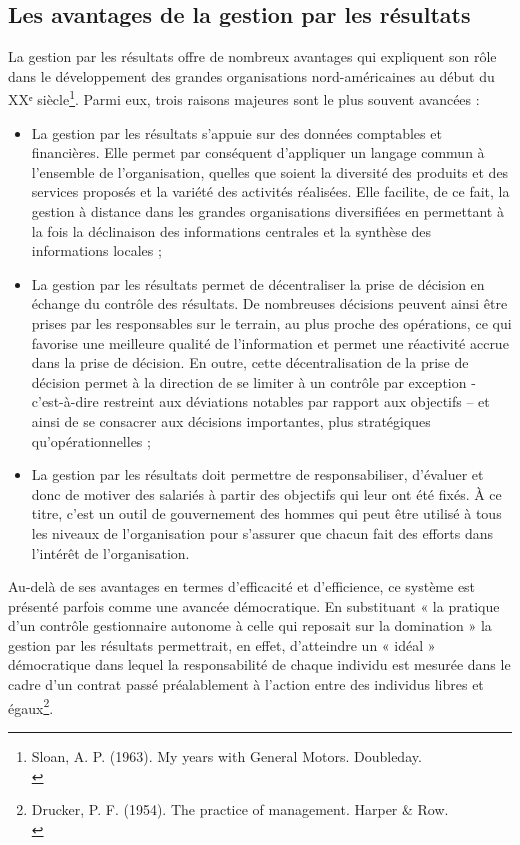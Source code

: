 \documentclass{kaobook}
\begin{document}
\subsection{Les avantages de la gestion par les résultats}
\label{sec:org0931deb}
La gestion par les résultats offre de nombreux avantages qui expliquent son rôle dans le développement des grandes organisations nord-américaines au début du XXᵉ siècle\footnote{Sloan, A. P. (1963). My years with General Motors. Doubleday.\\}. Parmi eux, trois raisons majeures sont le plus souvent avancées :\\
\begin{itemize}
\item La gestion par les résultats s’appuie sur des données comptables et financières. Elle permet par conséquent d’appliquer un langage commun à l’ensemble de l’organisation, quelles que soient la diversité des produits et des services proposés et la variété des activités réalisées. Elle facilite, de ce fait, la gestion à distance dans les grandes organisations diversifiées en permettant à la fois la déclinaison des informations centrales et la synthèse des informations locales ;\\
\item La gestion par les résultats permet de décentraliser la prise de décision en échange du contrôle des résultats. De nombreuses décisions peuvent ainsi être prises par les responsables sur le terrain, au plus proche des opérations, ce qui favorise une meilleure qualité de l’information et permet une réactivité accrue dans la prise de décision. En outre, cette décentralisation de la prise de décision permet à la direction de se limiter à un contrôle par exception - c’est-à-dire restreint aux déviations notables par rapport aux objectifs – et ainsi de se consacrer aux décisions importantes, plus stratégiques qu’opérationnelles ;\\
\item La gestion par les résultats doit permettre de responsabiliser, d’évaluer et donc de motiver des salariés à partir des objectifs qui leur ont été fixés. À ce titre, c’est un outil de gouvernement des hommes qui peut être utilisé à tous les niveaux de l’organisation pour s’assurer que chacun fait des efforts dans l’intérêt de l’organisation.\\
\end{itemize}
Au-delà de ses avantages en termes d’efficacité et d’efficience, ce système est présenté parfois comme une avancée démocratique. En substituant « la pratique d’un contrôle gestionnaire autonome à celle qui reposait sur la domination » la gestion par les résultats permettrait, en effet, d’atteindre un « idéal » démocratique dans lequel la responsabilité de chaque individu est mesurée dans le cadre d’un contrat passé préalablement à l’action entre des individus libres et égaux\footnote{Drucker, P. F. (1954). The practice of management. Harper \& Row.\\}.\\
\end{document}

